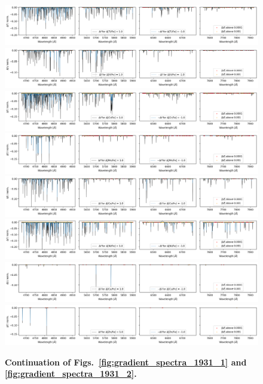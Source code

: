 \documentclass[
  journal=pasa,
  manuscript=research-paper, %
  year=2021,
  volume=37,
]{cup-journal}
\begin{document}
\begin{figure}[hbt!]
 \centering  
 \includegraphics[width=\textwidth]{figures/gradient_spectrum_1931_ti_fe.png}
 \includegraphics[width=\textwidth]{figures/gradient_spectrum_1931_v_fe.png}
 \includegraphics[width=\textwidth]{figures/gradient_spectrum_1931_cr_fe.png}
 \includegraphics[width=\textwidth]{figures/gradient_spectrum_1931_mn_fe.png}
 \includegraphics[width=\textwidth]{figures/gradient_spectrum_1931_co_fe.png}
 \includegraphics[width=\textwidth]{figures/gradient_spectrum_1931_ni_fe.png}
 \includegraphics[width=\textwidth]{figures/gradient_spectrum_1931_cu_fe.png}
 \includegraphics[width=\textwidth]{figures/gradient_spectrum_1931_zn_fe.png}
 \caption{\textbf{Continuation of Figs.~\ref{fig:gradient_spectra_1931_1} and \ref{fig:gradient_spectra_1931_2}.}} \label{fig:gradient_spectra_1931_3}
\end{figure}
\end{document}
